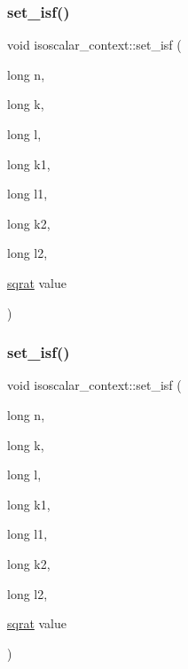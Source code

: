 \mbox{\label{classisoscalar__context_a3331c9cd09a538d5705a6a1ad75a3d99}} 
\subsubsection{\texorpdfstring{set\_isf()}{set\_isf()}\hspace{0.1cm}{\footnotesize\ttfamily [1/2]}}
{\footnotesize\ttfamily void isoscalar\+\_\+context\+::set\+\_\+isf (\begin{DoxyParamCaption}\item[{long}]{n,  }\item[{long}]{k,  }\item[{long}]{l,  }\item[{long}]{k1,  }\item[{long}]{l1,  }\item[{long}]{k2,  }\item[{long}]{l2,  }\item[{\mbox{\hyperlink{classsqrat}{sqrat}}}]{value }\end{DoxyParamCaption})}

\mbox{\label{classisoscalar__context_a3331c9cd09a538d5705a6a1ad75a3d99}} 
\subsubsection{\texorpdfstring{set\_isf()}{set\_isf()}\hspace{0.1cm}{\footnotesize\ttfamily [2/2]}}
{\footnotesize\ttfamily void isoscalar\+\_\+context\+::set\+\_\+isf (\begin{DoxyParamCaption}\item[{long}]{n,  }\item[{long}]{k,  }\item[{long}]{l,  }\item[{long}]{k1,  }\item[{long}]{l1,  }\item[{long}]{k2,  }\item[{long}]{l2,  }\item[{\mbox{\hyperlink{classsqrat}{sqrat}}}]{value }\end{DoxyParamCaption})}



